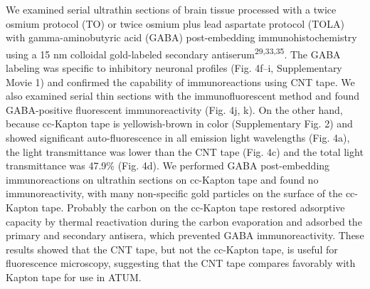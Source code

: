 \documentclass{article}
\begin{document}
We examined serial ultrathin sections of brain tissue processed with a twice osmium protocol (TO) or twice osmium plus lead aspartate protocol (TOLA) with gamma-aminobutyric acid (GABA) post-embedding immunohistochemistry using a 15 nm colloidal gold-labeled secondary antiserum\textsuperscript{29,33,35}. The GABA labeling was specific to inhibitory neuronal profiles (Fig. 4f–i, Supplementary Movie 1) and confirmed the capability of immunoreactions using CNT tape. We also examined serial thin sections with the immunofluorescent method and found GABA-positive fluorescent immunoreactivity (Fig. 4j, k). On the other hand, because cc-Kapton tape is yellowish-brown in color (Supplementary Fig. 2) and showed significant auto-fluorescence in all emission light wavelengths (Fig. 4a), the light transmittance was lower than the CNT tape (Fig. 4c) and the total light transmittance was 47.9\% (Fig. 4d). We performed GABA post-embedding immunoreactions on ultrathin sections on cc-Kapton tape and found no immunoreactivity, with many non-specific gold particles on the surface of the cc-Kapton tape. Probably the carbon on the cc-Kapton tape restored adsorptive capacity by thermal reactivation during the carbon evaporation 
and adsorbed the primary and secondary antisera, which prevented GABA immunoreactivity. These results showed that the CNT tape, but not the cc-Kapton tape, is useful for fluorescence microscopy, suggesting that the CNT tape compares favorably with Kapton tape for use in ATUM.
\end{document}

